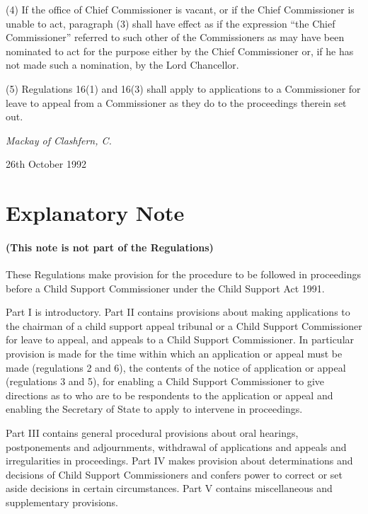 \documentclass[12pt,a4paper]{article}
\begin{document}
(4) If the office of Chief Commissioner is vacant, or if the Chief Commissioner is unable to act, paragraph (3) shall have effect as if the expression “the Chief Commissioner” referred to such other of the Commissioners as may have been nominated to act for the purpose either by the Chief Commissioner or, if he has not made such a nomination, by the Lord Chancellor.

(5) Regulations 16(1) and 16(3) shall apply to applications to a Commissioner for leave to appeal from a Commissioner as they do to the proceedings therein set out.

\bigskip

{\raggedleft
\emph{Mackay of Clashfern, C.}


}

26th October 1992

\small

\part{Explanatory Note}

\renewcommand\parthead{--- Explanatory Note}

\subsection*{(This note is not part of the Regulations)}

 These Regulations make provision for the procedure to be followed in proceedings before a Child Support Commissioner under the Child Support Act 1991.

  Part I is introductory. Part II contains provisions about making applications to the chairman of a child support appeal tribunal or a Child Support Commissioner for leave to appeal, and appeals to a Child Support Commissioner. In particular provision is made for the time within which an application or appeal must be made (regulations 2 and 6), the contents of the notice of application or appeal (regulations 3 and 5), for enabling a Child Support Commissioner to give directions as to who are to be respondents to the application or appeal and enabling the Secretary of State to apply to intervene in proceedings.

  Part III contains general procedural provisions about oral hearings, postponements and adjournments, withdrawal of applications and appeals and irregularities in proceedings. Part IV makes provision about determinations and decisions of Child Support Commissioners and confers power to correct or set aside decisions in certain circumstances. Part V contains miscellaneous and supplementary provisions.
\end{document}
